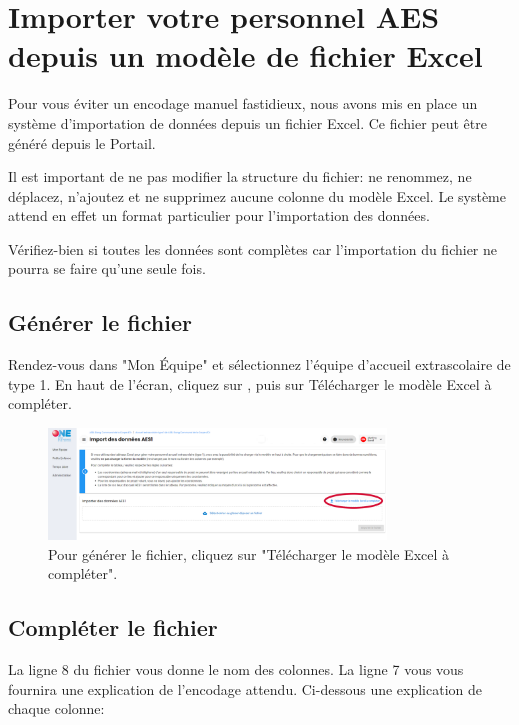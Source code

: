 \chapter{Importer votre personnel AES depuis un modèle de fichier Excel}

Pour vous éviter un encodage manuel fastidieux, nous avons mis en place un système d'importation de données depuis un fichier Excel. Ce fichier  peut être généré depuis le Portail. 

\begin{attention}
Il est important de ne pas modifier la structure du fichier: ne renommez, ne déplacez, n'ajoutez et ne supprimez aucune colonne du modèle Excel. Le système attend en effet un format particulier pour l'importation des données.

Vérifiez-bien si toutes les données sont complètes car l'importation du fichier ne pourra se faire qu'une seule fois. 
\end{attention}

\section{Générer le fichier}
Rendez-vous dans "Mon Équipe" et sélectionnez l'équipe d'accueil extrascolaire de type 1. En haut de l'écran, cliquez sur , puis sur Télécharger le modèle Excel à compléter. 


\begin{figure}[!h]
    \centering
    \includegraphics[width=0.8\textwidth]{Images/aes/upload_aes1/import_aes1_dl.png}
    \caption{Pour générer le fichier, cliquez sur "Télécharger le modèle Excel à compléter".}
    \label{fig:aes1_dl_modèle}
\end{figure}



\section{Compléter le fichier}
La ligne 8 du fichier vous donne le nom des colonnes. La ligne 7 vous vous fournira une explication de l'encodage attendu. Ci-dessous une explication de chaque colonne:

